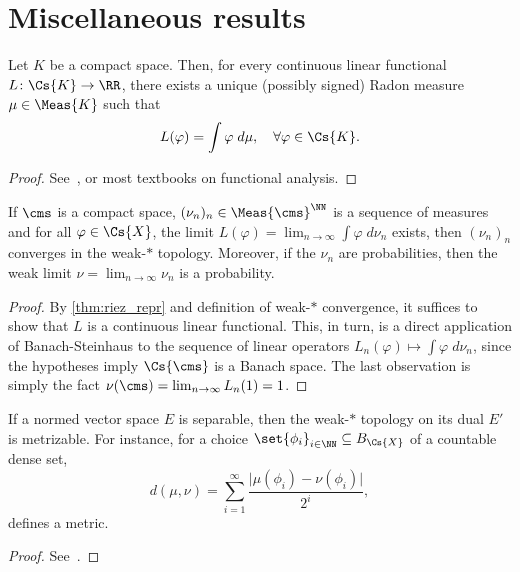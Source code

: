 \documentclass[../main]{subfiles}
\begin{document}
\chapter{Miscellaneous results}

\begin{theorem}\label{thm:riez_repr}
  Let \(K\) be a compact space. Then, for every continuous linear functional \(L \colon \Cs{K} \to \RR\), there exists a unique (possibly signed) Radon measure \(\mu \in \Meas{K}\) such that
  \begin{equation*}
    L(\varphi) = \int \varphi\;d\mu, \quad \forall \varphi \in \Cs{K}.
  \end{equation*}
\end{theorem}

\begin{proof}
  See~\cite[Theorem 7.10.4]{bogachevMeasureTheory2007}, or most textbooks on functional analysis.
\end{proof}

\begin{corollary}\label{cor:conv_of_exists}
  If \(\cms\) is a compact space,  \((\nu_n)_n \in \Meas{\cms}^{\NN}\) is a sequence of measures and for all \(\varphi \in \Cs{X}\), the limit \(L(\varphi) = \lim_{n \to \infty} \int \varphi \;d\nu_n\) exists, then \((\nu_n)_n\) converges in the weak-\(\ast\) topology. Moreover, if the \(\nu_n\) are probabilities, then the weak limit \(\nu = \lim_{n \to \infty} \nu_n\) is a probability.
\end{corollary}

\begin{proof}
  By \cref{thm:riez_repr} and definition of weak-\(\ast\) convergence, it suffices to show that \(L\) is a continuous linear functional. This, in turn, is a direct application of Banach-Steinhaus to the sequence of linear operators \(L_n(\varphi) \mapsto \int \varphi\;d\nu_n\), since the hypotheses imply \(\Cs{\cms}\) is a Banach space. The last observation is simply the fact \(\nu(\cms) = \lim_{n \to \infty} L_n(1) = 1\).
\end{proof}




\begin{proposition}\label{prop:weak-star-metrizable}
  If a normed vector space \(E\) is separable, then the weak-\(\ast\) topology on its dual \(E'\) is metrizable. For instance, for a choice \(\set{\phi_i}_{i \in \NN} \subseteq B_{\Cs{X}}\) of a countable dense set,
  \begin{equation*}
    d(\mu, \nu) = \sum_{i = 1}^{\infty} \frac{\lvert \mu(\phi_i) - \nu(\phi_i) \rvert}{2^{i}},
  \end{equation*}
  defines a metric.
\end{proposition}

\begin{proof}
  See~\cite[proposition 6.5.1]{botelhoFundamentosAnáliseFuncional2023}.
\end{proof}

\label{ultima_pagina_numerada}
\end{document}
